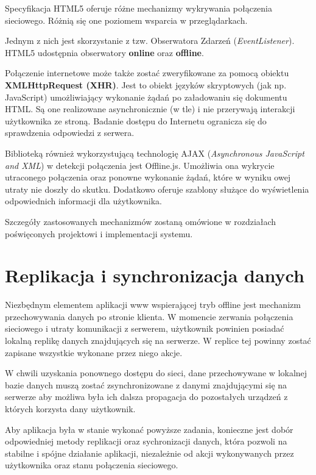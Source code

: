 Specyfikacja HTML5 oferuje różne mechanizmy wykrywania połączenia sieciowego. Różnią się one poziomem wsparcia w przeglądarkach.

Jednym z nich jest skorzystanie z tzw. Obserwatora Zdarzeń (\emph{EventListener})\cite{html5off}. HTML5 udostępnia obserwatory \textbf{online} oraz \textbf{offline}.

Połączenie internetowe może także zostać zweryfikowane za pomocą obiektu \textbf{XMLHttpRequest (XHR)}\cite{xhr}. Jest to obiekt języków skryptowych (jak np. JavaScript) umożliwiający wykonanie żądań po załadowaniu się dokumentu HTML. Są one realizowane asynchronicznie (w tle) i nie przerywają interakcji użytkownika ze stroną. Badanie dostępu do Internetu ogranicza się do sprawdzenia odpowiedzi z serwera.

Biblioteką również wykorzystującą technologię AJAX (\emph{Asynchronous JavaScript and XML}) w detekcji połączenia jest Offline.js. Umożliwia ona wykrycie utraconego połączenia oraz ponowne wykonanie żądań, które w wyniku owej utraty nie doszły do skutku. Dodatkowo oferuje szablony służące do wyświetlenia odpowiednich informacji dla użytkownika.

Szczegóły zastosowanych mechanizmów zostaną omówione w rozdziałach poświęconych projektowi i implementacji systemu.

\section{Replikacja i synchronizacja danych}
\label{sec:repIsynchDanych}

Niezbędnym elementem aplikacji www wspierającej tryb offline jest mechanizm  przechowywania danych po stronie klienta. W momencie zerwania połączenia sieciowego  i utraty komunikacji z serwerem, użytkownik powinien posiadać lokalną replikę danych znajdujących się na serwerze. W replice tej powinny zostać zapisane wszystkie wykonane przez niego akcje.

W chwili uzyskania ponownego dostępu do sieci, dane przechowywane w lokalnej bazie danych muszą zostać zsynchronizowane z danymi znajdującymi się na serwerze aby możliwa była ich dalsza propagacja do pozostałych urządzeń z których korzysta dany użytkownik.

Aby aplikacja była w stanie wykonać powyższe zadania, konieczne jest dobór odpowiedniej metody replikacji oraz sychronizacji danych, która pozwoli na stabilne i spójne działanie aplikacji, niezależnie od akcji wykonywanych przez użytkownika oraz stanu połączenia sieciowego.

